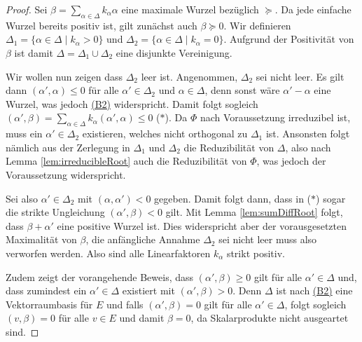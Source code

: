 \begin{proof}
  Sei $\beta = \sum_{\alpha \in \Delta} k_\alpha \alpha$ eine maximale Wurzel bezüglich $\succeq$.
  Da jede einfache Wurzel bereits positiv ist, gilt zunächst auch $\beta \succeq 0$.
  Wir definieren $\Delta_1 = \{\alpha \in \Delta \mid k_\alpha > 0\}$ und $\Delta_2 = \{\alpha \in \Delta \mid k_\alpha = 0\}$.
  Aufgrund der Positivität von $\beta$ ist damit $\Delta = \Delta_1 \cup \Delta_2$ eine disjunkte Vereinigung.

  Wir wollen nun zeigen dass $\Delta_2$ leer ist.
  Angenommen, $\Delta_2$ sei nicht leer.
  Es gilt dann $(\alpha', \alpha) \leq 0$ für alle $\alpha' \in \Delta_2$ und $\alpha \in \Delta$, denn sonst wäre $\alpha' - \alpha$ eine Wurzel, was jedoch \hyperref[it:B2]{(B2)} widerspricht.
  Damit folgt sogleich $(\alpha', \beta) = \sum_{\alpha \in \Delta} k_\alpha (\alpha', \alpha) \leq 0 $ ($\ast$).
  Da $\Phi$ nach Voraussetzung irreduzibel ist, muss ein $\alpha' \in \Delta_2$ existieren, welches nicht orthogonal zu $\Delta_1$ ist.
  Ansonsten folgt nämlich aus der Zerlegung in $\Delta_1$ und $\Delta_2$ die Reduzibilität von $\Delta$, also nach Lemma \ref{lem:irreducibleRoot} auch die Reduzibilität von $\Phi$, was jedoch der Voraussetzung widerspricht.

  Sei also $\alpha' \in \Delta_2$ mit $(\alpha, \alpha') < 0$ gegeben.
  Damit folgt dann, dass in ($\ast$) sogar die strikte Ungleichung $(\alpha', \beta) < 0$ gilt.
  Mit Lemma \ref{lem:sumDiffRoot} folgt, dass $\beta + \alpha'$ eine positive Wurzel ist.
  Dies widerspricht aber der vorausgesetzten Maximalität von $\beta$, die anfängliche Annahme $\Delta_2$ sei nicht leer muss also verworfen werden.
  Also sind alle Linearfaktoren $k_\alpha$ strikt positiv.

  Zudem zeigt der vorangehende Beweis, dass $(\alpha', \beta) \geq 0$ gilt für alle $\alpha' \in \Delta$ und, dass zumindest ein $\alpha' \in \Delta$ existiert mit $(\alpha', \beta) > 0$.
    Denn $\Delta$ ist nach \hyperref[it:B2]{(B2)} eine Vektorraumbasis für $E$ und falls $(\alpha', \beta) = 0$ gilt für alle $\alpha' \in \Delta$, folgt sogleich $(v, \beta) = 0$ für alle $v \in E$ und damit $\beta = 0$, da Skalarprodukte nicht ausgeartet sind.


\end{proof}
